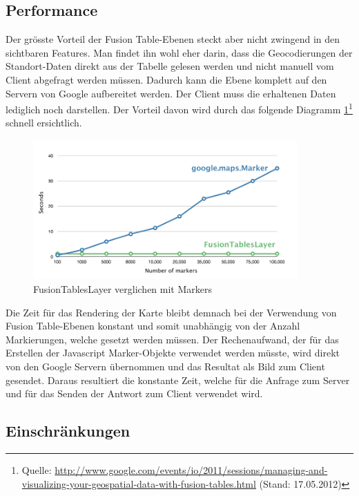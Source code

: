 \subsection{Performance}
Der grösste Vorteil der Fusion Table-Ebenen steckt aber nicht zwingend in den sichtbaren Features. Man findet ihn wohl eher darin, dass die Geocodierungen der Standort-Daten direkt aus der Tabelle gelesen werden und nicht manuell vom Client abgefragt werden müssen. Dadurch kann die Ebene komplett auf den Servern von Google aufbereitet werden. Der Client muss die erhaltenen Daten lediglich noch darstellen. Der Vorteil davon wird durch das folgende Diagramm \ref{fusiontableslayer-compare_markers}\footnote{Quelle: \url{http://www.google.com/events/io/2011/sessions/managing-and-visualizing-your-geospatial-data-with-fusion-tables.html} (Stand: 17.05.2012)} schnell ersichtlich.

\begin{figure}[!h]
	\centering
	\includegraphics[width=0.9\textwidth]{images/einfuehrung/gmap_fusiontableslayer_vs_markers}
	\caption{FusionTablesLayer verglichen mit Markers}
	\label{fusiontableslayer-compare_markers}
\end{figure}

Die Zeit für das Rendering der Karte bleibt demnach bei der Verwendung von Fusion Table-Ebenen konstant und somit unabhängig von der Anzahl Markierungen, welche gesetzt werden müssen. Der Rechenaufwand, der für das Erstellen der Javascript Marker-Objekte verwendet werden müsste, wird direkt von den Google Servern übernommen und das Resultat als Bild zum Client gesendet. Daraus resultiert die konstante Zeit, welche für die Anfrage zum Server und für das Senden der Antwort zum Client verwendet wird.

\subsection{Einschränkungen}
